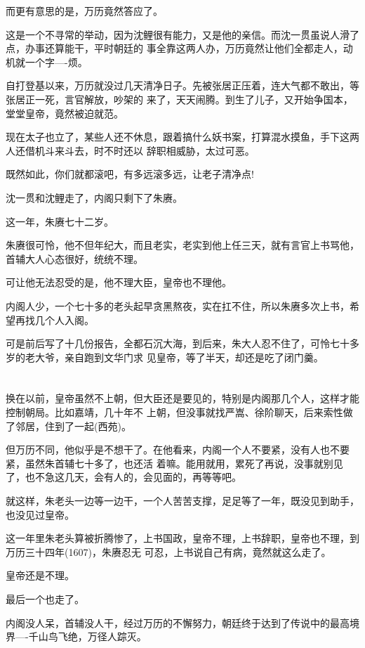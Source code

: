 \documentclass[11pt,a4paper,onecolumn]{article}
\begin{document}
而更有意思的是，万历竟然答应了。

这是一个不寻常的举动，因为沈鲤很有能力，又是他的亲信。而沈一贯虽说人滑了点，办事还算能干，平时朝廷的
事全靠这两人办，万历竟然让他们全都走人，动机就一个字----烦。

自打登基以来，万历就没过几天清净日子。先被张居正压着，连大气都不敢出，等张居正一死，言官解放，吵架的
来了，天天闹腾。到生了儿子，又开始争国本，堂堂皇帝，竟然被迫就范。

现在太子也立了，某些人还不休息，跟着搞什么妖书案，打算混水摸鱼，手下这两人还借机斗来斗去，时不时还以
辞职相威胁，太过可恶。

既然如此，你们就都滚吧，有多远滚多远，让老子清净点!

沈一贯和沈鲤走了，内阁只剩下了朱赓。

这一年，朱赓七十二岁。

朱赓很可怜，他不但年纪大，而且老实，老实到他上任三天，就有言官上书骂他，首辅大人心态很好，统统不理。

可让他无法忍受的是，他不理大臣，皇帝也不理他。

内阁人少，一个七十多的老头起早贪黑熬夜，实在扛不住，所以朱赓多次上书，希望再找几个人入阁。

可是前后写了十几份报告，全都石沉大海，到后来，朱大人忍不住了，可怜七十多岁的老大爷，亲自跑到文华门求
见皇帝，等了半天，却还是吃了闭门羹。

\section[\thesection]{}

换在以前，皇帝虽然不上朝，但大臣还是要见的，特别是内阁那几个人，这样才能控制朝局。比如嘉靖，几十年不
上朝，但没事就找严嵩、徐阶聊天，后来索性做了邻居，住到了一起(西苑)。

但万历不同，他似乎是不想干了。在他看来，内阁一个人不要紧，没有人也不要紧，虽然朱首辅七十多了，也还活
着嘛。能用就用，累死了再说，没事就别见了，也不急这几天，会有人的，会见面的，再等等吧。

就这样，朱老头一边等一边干，一个人苦苦支撑，足足等了一年，既没见到助手，也没见过皇帝。

这一年里朱老头算被折腾惨了，上书国政，皇帝不理，上书辞职，皇帝也不理，到万历三十四年(1607)，朱赓忍无
可忍，上书说自己有病，竟然就这么走了。

皇帝还是不理。

最后一个也走了。

内阁没人呆，首辅没人干，经过万历的不懈努力，朝廷终于达到了传说中的最高境界----千山鸟飞绝，万径人踪灭。
\end{document}
